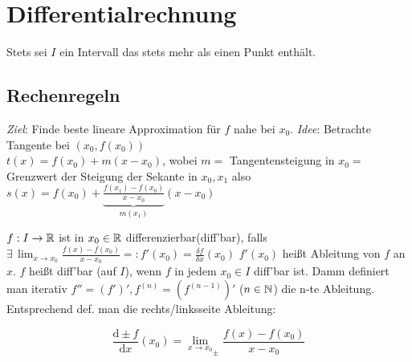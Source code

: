 \documentclass[12pt]{scrreprt}
\begin{document}
\chapter{Differentialrechnung}
\label{cha:diff}
Stets sei $I$ ein Intervall das stets mehr als einen Punkt enthält.
\section{Rechenregeln}
\label{sec:diff.rechenregeln}
\emph{Ziel}: Finde beste lineare Approximation für $f$ nahe bei $x_0$.
\emph{Idee}: Betrachte Tangente bei $(x_0, f(x_0))$\\
$t(x) = f(x_0) + m(x-x_0)$,
wobei $m= $ Tangentensteigung in $x_0 =$ Grenzwert der Steigung der Sekante in $x_0, x_1$ also 
$s(x) = f(x_0) + \underbrace{\frac{f(x_1)-f(x_0)}{x-x_0}}_{m(x_1)} (x-x_0)$

\begin{dfn}\label{dfn:diff.rechenregeln.diffbar} $f: I \rightarrow \mathbb{R}$ ist in $x_0 \in \mathbb{R}$ differenzierbar(diff'bar), falls
$\exists\,\lim_{x\to x_0} \frac{f(x) - f(x_0)}{x-x_0} =: f'(x_0) = \frac{\delta f}{\delta x}(x_0)$ %
$f'(x_0)$ heißt Ableitung von $f$ an $x$. $f$ heißt diff'bar (auf $I$), wenn $f$ in jedem $x_0 \in I$ diff'bar ist. Damm definiert man
iterativ $f'' = (f')', f^(n) = (f^(n-1))'$ ($n \in \mathbb{N}$) die n-te Ableitung.
Entsprechend def. man die rechts/linksseite Ableitung:

\begin{equation}
\frac{\mathrm{d} \pm f}{\mathrm{d} x}(x_0) = {\lim_{x\to x_0}}_\pm \frac{f(x) - f(x_0)}{x-x_0}
\end{equation}
\end{dfn}
\end{document}
